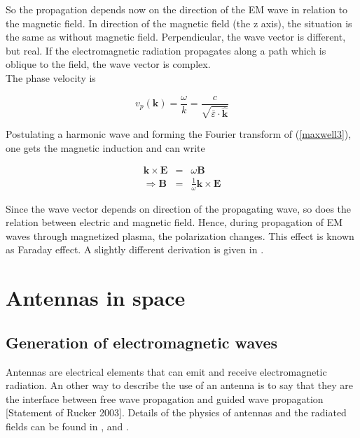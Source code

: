 \documentclass[a4paper,14pt]{extbook}
\begin{document}
So the propagation depends now on the direction of the EM wave in relation to the magnetic field. In direction of the magnetic field (the z axis), the situation is the same as without magnetic field. Perpendicular, the wave vector is different, but real. If the electromagnetic radiation propagates along a path which is oblique to the field, the wave vector is complex.\\

The phase velocity is

\begin{equation}\label{phasespeed_magnetoplasma}
    v_p(\mathbf{k})=\frac{\omega}{k}= \frac{c}{ \sqrt{\bar{\varepsilon}\cdot \mathbf{\hat{k}}}}
\end{equation}

Postulating a harmonic wave and forming the Fourier transform of (\ref{maxwell3}), one gets the magnetic induction and can write

\begin{eqnarray}
\mathbf{k} \times \mathbf{E}&=&\omega \mathbf{B}\\
\Rightarrow \mathbf{B}&=&\frac{1}{\omega} \mathbf{k} \times \mathbf{E}
\end{eqnarray}

Since the wave vector depends on direction of the propagating wave, so does the relation between electric and magnetic field. Hence, during propagation of EM waves through magnetized plasma, the polarization changes. This effect is known as Faraday effect. A slightly different derivation is given in \cite{leitinger}.


\chapter{Antennas in space}

\section{Generation of electromagnetic waves}
Antennas are electrical elements that can emit and receive electromagnetic radiation. An other way to describe the use of an antenna is to say that they are the interface between free wave propagation and guided wave propagation [Statement of Rucker 2003]. Details of the physics of antennas and the radiated fields can be found in \cite{grant}, \cite{emwaves} and \cite{jackson}.\\
\end{document}
